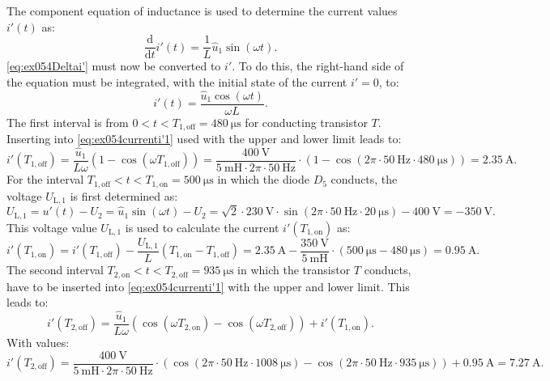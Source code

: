 
\begin{solutionblock}
    The component equation of inductance is used to determine the current values $i'(t)$ as:
    \begin{equation}
        \frac{\mathrm{d}}{\mathrm{d}t}i'(t) = \frac{1}{L}\hat u_\mathrm{1} \sin(\omega t).\label{eq:ex054Deltai'}
    \end{equation}
    \eqref{eq:ex054Deltai'} must now be converted to $i'$. To do this, the right-hand side of the equation must be integrated, with the initial state of the current $i'= 0$, to:
    \begin{equation}
        i'(t)=\frac{\hat u_\mathrm{1} \cos(\omega t)}{\omega L}.\label{eq:ex054currenti'1}
    \end{equation}
    The first interval is from $0 < t < T_\mathrm{1,off} = \SI{480}{\micro\s}$ for conducting transistor $T$. Inserting into \eqref{eq:ex054currenti'1} used with the upper and lower limit leads to:
    \begin{equation}
        i'(T_\mathrm{1,off}) = \frac{\hat u_\mathrm{1}}{L \omega}(1- \cos(\omega T_\mathrm{1,off})) = \frac{\SI{400}{\volt}}{\SI{5}{\milli\henry}\cdot 2\pi \cdot \SI{50}{\hertz}}\cdot (1-\cos(2\pi \cdot \SI{50}{\hertz} \cdot \SI{480}{\micro\s})) = \SI{2.35}{\ampere}.
    \end{equation}
    For the interval $T_\mathrm{1,off} < t < T_\mathrm{1,on} = \SI{500}{\micro\s}$ in which the diode $D_\mathrm{5}$ conducts, the voltage $U_\mathrm{L,1}$ is first determined as:
    \begin{equation}
        U_\mathrm{L,1} = u'(t) - U_\mathrm{2}= \hat u_\mathrm{1} \sin(\omega t) - U_\mathrm{2} = \sqrt{2} \cdot \SI{230}{\volt} \cdot \sin(2\pi \cdot \SI{50}{\hertz}\cdot \SI{20}{\micro\s}) - \SI{400}{\volt} = -\SI{350}{\volt}.
    \end{equation}
    This voltage value  $U_\mathrm{L,1}$ is used to calculate the current  $i'(T_\mathrm{1,on})$ as:
    \begin{equation}
        i'(T_\mathrm{1,on}) = i'(T_\mathrm{1,off}) -\frac{ U_\mathrm{L,1}}{L}(T_\mathrm{1,on}-T_\mathrm{1,off}) = \SI{2.35}{\ampere} -\frac{\SI{350}{\volt}}{\SI{5}{\milli\henry}}\cdot (\SI{500}{\micro\s}-\SI{480}{\micro\s}) = \SI{0.95}{\ampere}.
    \end{equation}
     The second interval  $T_\mathrm{2,on} < t < T_\mathrm{2,off}  = \SI{935}{\micro\s}$ in which the transistor $T$ conducts, have to be inserted  into \eqref{eq:ex054currenti'1} with the upper and lower limit. This leads to:
     \begin{equation}
        i'(T_\mathrm{2,off}) = \frac{\hat u_\mathrm{1}}{L \omega}(\cos (\omega T_\mathrm{2,on})- \cos(\omega T_\mathrm{2,off}))+ i'(T_\mathrm{1,on}).
    \end{equation}
    With values:
    \begin{equation}
        i'(T_\mathrm{2,off}) = \frac{\SI{400}{\volt}}{\SI{5}{\milli\henry}\cdot 2\pi \cdot \SI{50}{\hertz}}\cdot (\cos(2\pi \cdot \SI{50}{\hertz}\cdot \SI{1008}{\micro\s})-\cos(2\pi \cdot \SI{50}{\hertz} \cdot \SI{935}{\micro\s})) + \SI{0.95}{\ampere}= \SI{7.27}{\ampere}.
     \end{equation}


\end{solutionblock}
